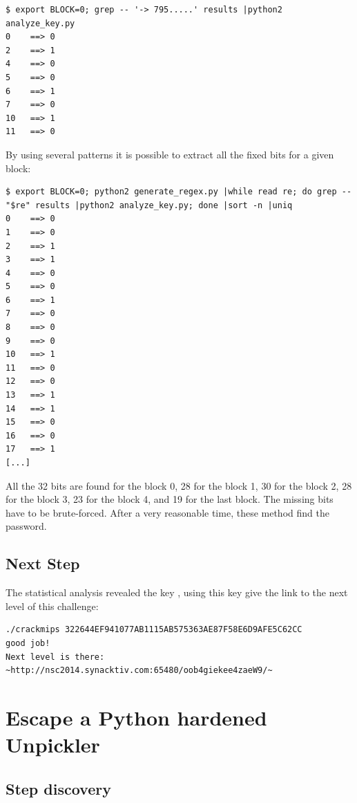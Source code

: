 \documentclass[a4paper]{article}
\begin{document}
\begin{lstlisting}[caption={get fixed bits for a given pattern (see listing \ref{analyze_key})},numbers=none,style=colortilde]
$ export BLOCK=0; grep -- '-> 795.....' results |python2 analyze_key.py
0 	 ==> 0
2 	 ==> 1
4 	 ==> 0
5 	 ==> 0
6 	 ==> 1
7 	 ==> 0
10	 ==> 1
11	 ==> 0
\end{lstlisting}



By using several patterns it is possible to extract all the fixed bits for a given block:
\begin{lstlisting}[caption={get fixed bits for a given block (see listing \ref{analyze_key} and listing \ref{generate_regex})},numbers=none,style=colortilde]
$ export BLOCK=0; python2 generate_regex.py |while read re; do grep -- "$re" results |python2 analyze_key.py; done |sort -n |uniq
0 	 ==> 0
1 	 ==> 0
2 	 ==> 1
3 	 ==> 1
4 	 ==> 0
5 	 ==> 0
6 	 ==> 1
7 	 ==> 0
8 	 ==> 0
9 	 ==> 0
10	 ==> 1
11	 ==> 0
12	 ==> 0
13	 ==> 1
14	 ==> 1
15	 ==> 0
16	 ==> 0
17	 ==> 1
[...]
\end{lstlisting}


All the 32 bits are found for the block 0, 28 for the block 1, 30 for the block 2, 28 for the block 3, 23 for the block 4, and 19 for the last block.
\newline
The missing bits have to be brute-forced. After a very reasonable time, these method find the password.


\subsection{Next Step}

The statistical analysis revealed the key , using this key give the link to the next level of this challenge:

\begin{lstlisting}[caption={},numbers=none,style=colortilde]
./crackmips 322644EF941077AB1115AB575363AE87F58E6D9AFE5C62CC
good job!
Next level is there: ~http://nsc2014.synacktiv.com:65480/oob4giekee4zaeW9/~
\end{lstlisting}

\newpage

\section{Escape a Python hardened Unpickler}
\subsection{Step discovery}
\end{document}
